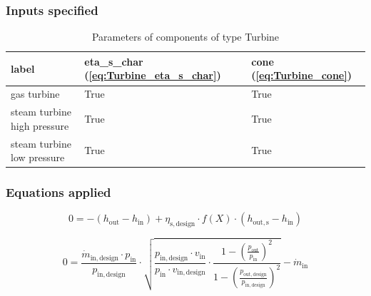 \subsubsection{Inputs specified}

\begin{table}[H]\begin{center}
\begin{tabular}{lll}
\toprule
                       label &  eta\_s\_char (\ref{eq:Turbine_eta_s_char}) &  cone (\ref{eq:Turbine_cone}) \\
\midrule
                 gas turbine &                                        True &                          True \\
 steam turbine high pressure &                                        True &                          True \\
  steam turbine low pressure &                                        True &                          True \\
\bottomrule
\end{tabular}
\caption{Parameters of components of type Turbine}
\end{center}\end{table}

\subsubsection{Equations applied}

\begin{equation}
\label{eq:Turbine_eta_s_char}
0=-\left(h_\mathrm{out}-h_\mathrm{in}\right)+\eta_\mathrm{s,design}\cdot f \left(X\right)\cdot\left(h_\mathrm{out,s}-h_\mathrm{in}\right)
\end{equation}

\begin{equation}
\label{eq:Turbine_cone}
0 = \frac{\dot{m}_\mathrm{in,design}\cdot p_\mathrm{in}}{p_\mathrm{in,design}}\cdot\sqrt{\frac{p_\mathrm{in,design}\cdot v_\mathrm{in}}{p_\mathrm{in}\cdot v_\mathrm{in,design}}\cdot\frac{1-\left(\frac{p_\mathrm{out}}{p_\mathrm{in}} \right)^{2}}{1-\left(\frac{p_\mathrm{out,design}}{p_\mathrm{in,design}}\right)^{2}}} -\dot{m}_\mathrm{in}
\end{equation}

